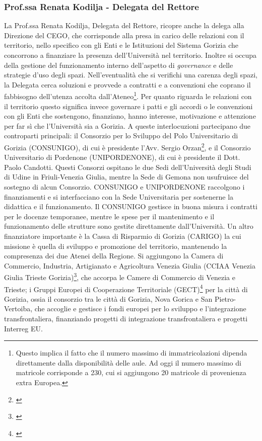         \subsubsection{Prof.ssa Renata Kodilja - Delegata del Rettore}
            La Prof.ssa Renata Kodilja, Delegata del Rettore, ricopre anche la delega alla Direzione del CEGO, che corrisponde alla presa in carico delle relazioni con il territorio, nello specifico con gli Enti e le Istituzioni del Sistema Gorizia che concorrono a  finanziare la presenza dell'Università nel territorio. Inoltre si occupa della gestione del funzionamento interno dell'aspetto di \textsl{governance} e delle strategie d'uso degli spazi. Nell'eventualità che si verifichi una carenza degli spazi, la Delegata cerca soluzioni e provvede a contratti e a convenzioni che coprano il fabbisogno dell'utenza accolta  dall'Ateneo\footnote{Questo implica il fatto che il numero massimo di immatricolazioni dipenda direttamente dalla disponibilità delle aule. Ad oggi il numero massimo di matricole corrisponde a 230, cui si aggiungono 20 matricole di provenienza extra Europea.}. \newline
            Per quanto riguarda le relazioni con il territorio questo significa invece governare i patti e gli accordi o le convenzioni con gli Enti che sostengono, finanziano, hanno interesse, motivazione e attenzione per far sì che l'Università sia a Gorizia. A queste interlocuzioni partecipano due controparti principali: il Consorzio per lo Sviluppo del Polo Universitario di Gorizia (CONSUNIGO), di cui è presidente l'Avv. Sergio Orzan\footnote{\cite{CONSUNIGO}}, e il Consorzio Universitario di Pordenone (UNIPORDENONE), di cui è presidente il Dott. Paolo Candotti. Questi Consorzi ospitano le due Sedi dell'Università degli Studi di Udine in Friuli-Venezia Giulia, mentre la Sede di Gemona non usufruisce del sostegno di alcun Consorzio. \newline
            CONSUNIGO e UNIPORDENONE raccolgono i finanziamenti e si interfacciano con la Sede Universitaria per sostenerne la didattica e il funzionamento. Il CONSUNIGO gestisce in buona misura i contratti per le docenze temporanee, mentre le spese per il mantenimento e il funzionamento delle strutture sono gestite direttamente dall'Università. \newline
            Un altro finanziatore importante è la Cassa di Risparmio di Gorizia (CARIGO) la cui missione è quella di sviluppo e promozione del territorio, mantenendo la compresenza dei due Atenei della Regione. 
            Si aggiungono la Camera di Commercio, Industria, Artigianato e Agricoltura Venezia Giulia (CCIAA Venezia Giulia Trieste Gorizia)\footnote{\cite{CCIAA}}, che accorpa le Camere di Commercio di Venezia e Trieste; i Gruppi Europei di Cooperazione Territoriale (GECT)\footnote{\cite{GECTGOEZTS}} per la città di Gorizia, ossia il consorzio tra le città di Gorizia, Nova Gorica e San Pietro-Vertoiba, che accoglie e gestisce i fondi europei per lo sviluppo e l'integrazione transfrontaliera, finanziando progetti di integrazione transfrontaliera e progetti Interreg EU.
